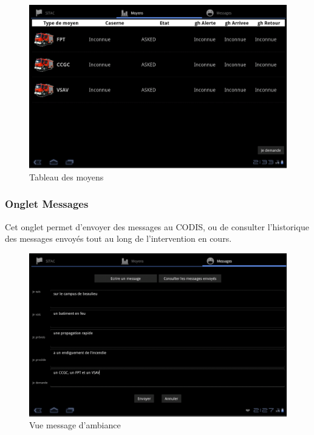 \documentclass{article}
\begin{document}
\begin{figure}[h!tb]
\begin{center}
\includegraphics[width=487pt]{Manueldutilisation-fig002.png}
\caption{Tableau des moyens}
\end{center}
\end{figure}


\subsubsection{Onglet Messages}

Cet onglet permet d’envoyer des messages au CODIS, ou de consulter l’historique des messages envoyés tout au long de l’intervention en cours.

\begin{figure}[b!]
\begin{center}
\includegraphics[width=487pt]{Manueldutilisation-fig003.png}
\caption{Vue message d'ambiance}
\end{center}
\end{figure}
\end{document}
